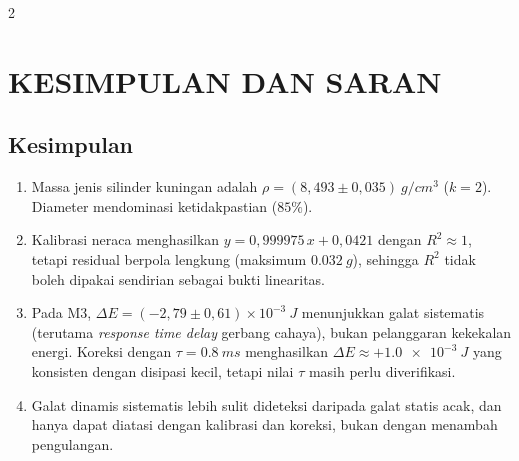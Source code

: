 \documentclass[a4paper, 12pt]{article}
\begin{document}
\begin{multicols}{2}
    \section{KESIMPULAN DAN SARAN}
        \subsection{Kesimpulan}
        \begin{enumerate}
            \item Massa jenis silinder kuningan adalah $\rho=(8{,}493\pm0{,}035)\ \si{g/cm^3}$ ($k=2$). Diameter mendominasi ketidakpastian ($85\%$).
            \item Kalibrasi neraca menghasilkan $y=0{,}999975\,x+0{,}0421$ dengan $R^2\approx 1$, tetapi residual berpola lengkung (maksimum $\SI{0,032}{g}$), sehingga $R^2$ tidak boleh dipakai sendirian sebagai bukti linearitas.
            \item Pada M3, $\Delta E=(-2{,}79\pm0{,}61)\times10^{-3}\ \si{J}$ menunjukkan galat sistematis (terutama \textit{response time delay} gerbang cahaya), bukan pelanggaran kekekalan energi. Koreksi dengan $\tau=\SI{0,8}{ms}$ menghasilkan $\Delta E\approx+\SI{1,0e-3}{J}$ yang konsisten dengan disipasi kecil, tetapi nilai $\tau$ masih perlu diverifikasi.
            \item Galat dinamis sistematis lebih sulit dideteksi daripada galat statis acak, dan hanya dapat diatasi dengan kalibrasi dan koreksi, bukan dengan menambah pengulangan.
        \end{enumerate}


\end{multicols}
\end{document}
